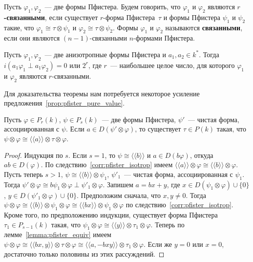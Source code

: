 \documentclass[a4paper,oneside,12pt]{article}
\theoremstyle{plain} { \swapnumbers
\newtheorem{theorem}{Теорема}[subsection]
\newtheorem{corollary}[theorem]{Следствие}
\newtheorem{lemma}[theorem]{Лемма}
\newtheorem{proposition}[theorem]{Утверждение}
\newtheorem{claim}[theorem]{Факт}
}
\theoremstyle{definition} { \swapnumbers
\newtheorem{definition}[theorem]{Определение}
\newtheorem{notation}[theorem]{Обозначение}
\newtheorem{remark}[theorem]{Замечание}
\newtheorem{remarks}[theorem]{Замечания}
\newtheorem{example}[theorem]{Пример}
\newtheorem{examples}[theorem]{Примеры}
\newtheorem{sssection}[theorem]{}
}
\def\ph{\varphi}
\def\la{\langle}
\def\ra{\rangle}
\def\lla{\la\!\la}
\def\rra{\ra\!\ra}
\begin{document}
\begin{definition}
Пусть $\ph_1,\ph_2$~--- две формы Пфистера. Будем говорить, что $\ph_1$ и $\ph_2$
являются {\bf $r$-связанными}, если существует $r$-форма Пфистера~$\tau$ и формы
Пфистера $\psi_1$ и $\psi_2$ такие, что $\ph_1\cong\tau\otimes\psi_1$
и $\ph_2\cong\tau\otimes\psi_2$. Формы $\ph_1$ и $\ph_2$ называются
{\bf связанными}, если они являются $(n-1)$-связанными $n$-формами Пфистера.
\end{definition}
\begin{theorem}
Пусть $\ph_1,\ph_2$~--- две анизотропные формы Пфистера и $a_1,a_2\in k^*$.
Тогда $i(a_1\ph_1\perp a_1\ph_2)=0$ или $2^r$, где $r$~--- наибольшее
целое число, для которого $\ph_1$ и $\ph_2$ являются $r$-связанными.
\end{theorem}
Для доказательства теоремы нам потребуется некоторое усиление
предложения~\ref{prop:pfister_pure_value}.
\begin{proposition}\label{prop:pfister_pure_value_strong}
Пусть $\ph\in P_r(k)$, $\psi\in P_s(k)$~--- две формы Пфистера, $\psi'$~--- чистая
форма, ассоциированная с $\psi$. Если $a\in D(\psi'\otimes\ph)$, то существует
$\tau\in P(k)$ такая, что $\psi\otimes\ph\cong\lla a\rra\otimes\tau\otimes\ph$.
\end{proposition}
\begin{proof}
Индукция по $s$. Если $s=1$, то $\psi\cong\lla b\rra$ и $a\in D(b\ph)$,
откуда $ab\in D(\ph)$. По следствию~\ref{corr:pfister_isotrop} имеем
$\lla a\rra\otimes\ph\cong\lla b\rra\otimes\ph$.
Пусть теперь $s>1$, $\psi\cong\lla b\rra\otimes\psi_1$, $\psi'_1$~--- чистая
форма, ассоциированная с $\psi_1$. Тогда
$\psi'\otimes\ph\cong b\psi_1\otimes\ph\perp\psi'_1\otimes\ph$.
Запишем $a=bx+y$, где $x\in D(\psi_1\otimes\ph)\cup\{0\}$, $y\in D(\psi'_1\otimes\ph)\cup\{0\}$.
Предположим сначала, что $x,y\neq 0$. Тогда
$\psi\otimes\ph\cong\lla b\rra\otimes\psi_1\otimes\ph\cong\lla bx\rra\otimes\psi_1\otimes\ph$
по следствию~\ref{corr:pfister_isotrop}.
Кроме того, по предположению индукции, существует форма Пфистера $\tau_1\in P_{s-1}(k)$ такая, что
$\psi_1\otimes\ph\cong\lla y\rra\otimes\tau_1\otimes\ph$. Теперь по лемме~\ref{lemma:pfister_equiv} имеем
$\psi\otimes\ph\cong\lla bx,y\rra\otimes\tau\otimes\ph\cong\lla a,-bxy\rra\otimes\tau_1\otimes\ph$.
Если же $y=0$ или $x=0$, достаточно только половины из этих рассуждений.
\end{proof}
\end{document}
